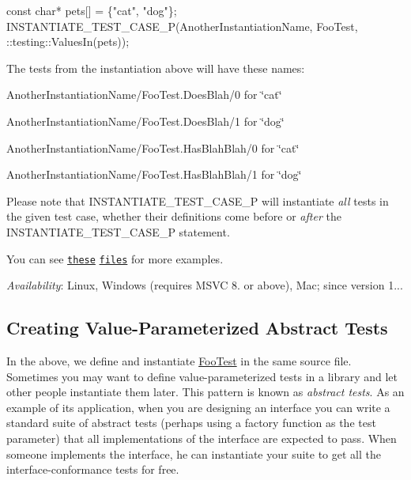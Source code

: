 \begin{DoxyCode}
const char* pets[] = \{"cat", "dog"\};
INSTANTIATE\_TEST\_CASE\_P(AnotherInstantiationName, FooTest,
                        ::testing::ValuesIn(pets));
\end{DoxyCode}


The tests from the instantiation above will have these names\+:


\begin{DoxyItemize}
\item {\ttfamily Another\+Instantiation\+Name/\+Foo\+Test.\+Does\+Blah/0} for {\ttfamily \char`\"{}cat\char`\"{}}
\item {\ttfamily Another\+Instantiation\+Name/\+Foo\+Test.\+Does\+Blah/1} for {\ttfamily \char`\"{}dog\char`\"{}}
\item {\ttfamily Another\+Instantiation\+Name/\+Foo\+Test.\+Has\+Blah\+Blah/0} for {\ttfamily \char`\"{}cat\char`\"{}}
\item {\ttfamily Another\+Instantiation\+Name/\+Foo\+Test.\+Has\+Blah\+Blah/1} for {\ttfamily \char`\"{}dog\char`\"{}}
\end{DoxyItemize}

Please note that {\ttfamily I\+N\+S\+T\+A\+N\+T\+I\+A\+T\+E\+\_\+\+T\+E\+S\+T\+\_\+\+C\+A\+S\+E\+\_\+P} will instantiate {\itshape all} tests in the given test case, whether their definitions come before or {\itshape after} the {\ttfamily I\+N\+S\+T\+A\+N\+T\+I\+A\+T\+E\+\_\+\+T\+E\+S\+T\+\_\+\+C\+A\+S\+E\+\_\+P} statement.

You can see \href{../samples/sample7_unittest.cc}{\tt these} \href{../samples/sample8_unittest.cc}{\tt files} for more examples.

{\itshape Availability}\+: Linux, Windows (requires M\+S\+VC 8. or above), Mac; since version 1...

\subsection*{Creating Value-\/\+Parameterized Abstract Tests}

In the above, we define and instantiate {\ttfamily \mbox{\hyperlink{class_foo_test}{Foo\+Test}}} in the same source file. Sometimes you may want to define value-\/parameterized tests in a library and let other people instantiate them later. This pattern is known as {\itshape abstract tests}. As an example of its application, when you are designing an interface you can write a standard suite of abstract tests (perhaps using a factory function as the test parameter) that all implementations of the interface are expected to pass. When someone implements the interface, he can instantiate your suite to get all the interface-\/conformance tests for free.

